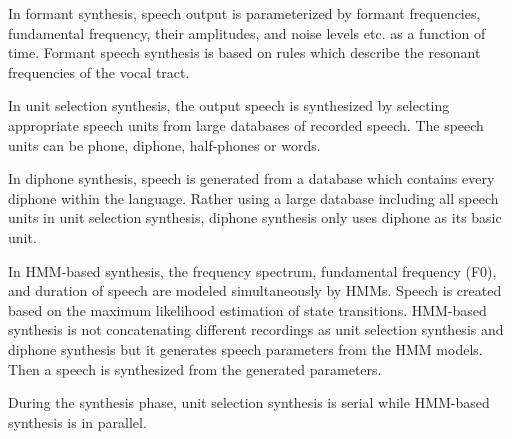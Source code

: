 \documentclass[12pt]{article}
\newenvironment{problem}[2][Problem]{\begin{trivlist}
\item[\hskip \labelsep {\bfseries #1}\hskip \labelsep {\bfseries #2.}]}{\end{trivlist}}
\begin{document}
\begin{problem}{2.1}
    In formant synthesis, speech output is parameterized by formant frequencies, 
    fundamental frequency, their amplitudes, and noise levels etc. as a function of time. 
    Formant speech synthesis is based on rules which describe the resonant frequencies 
    of the vocal tract. 
    
    In unit selection synthesis, the output speech is synthesized by selecting 
    appropriate speech units from large databases of recorded speech. 
    The speech units can be phone, diphone, half-phones or words. 
    
    In diphone synthesis, speech is generated from a database which contains every 
    diphone within the language. 
    Rather using a large database including all speech units in unit selection 
    synthesis, diphone synthesis only uses diphone as its basic unit. 
    
    In HMM-based synthesis, the frequency spectrum, fundamental frequency (F0), 
    and duration of speech are modeled simultaneously by HMMs. 
    Speech is created based on the maximum likelihood estimation of state transitions. 
    HMM-based synthesis is not concatenating different recordings 
    as unit selection synthesis and diphone synthesis but it generates speech parameters 
    from the HMM models. 
    Then a speech is synthesized from the generated parameters. 
    
    During the synthesis phase, unit selection synthesis is serial while 
    HMM-based synthesis is in parallel.
\end{problem}
\end{document}
